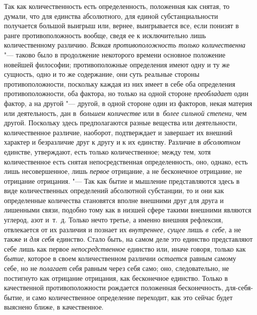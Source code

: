 \label{bkm:bm69a}Так как количественность есть определенность, положенная как
снятая, то думали, что для единства абсолютного, для единой субстанциальности
получается большой выигрыш или, вернее, выигрывается все, если понизят в ранге
противоположность вообще, сведя ее к исключительно лишь количественному
различию. {\em Всякая противоположность только количественна} "--- таково было
в продолжение некоторого времени основное положение новейшей
философии; противоположные определения
имеют одну и ту же сущность, одно и то же содержание, они суть реальные стороны
противоположности, поскольку каждая из них имеет в себе оба определения
противоположности, оба фактора, но только на одной стороне {\em преобладает}
один фактор, а на другой "--- другой, в одной стороне один из факторов, некая
материя или деятельность, дан в~{\em большем количестве} или
в~{\em более сильной степени}, чем другой. Поскольку здесь предполагаются
разные вещества или деятельности, количественное различие, наоборот,
подтверждает и завершает их внешний характер и безразличие друг к другу и к их
единству. Различие в {\em абсолютном} единстве, утверждают, есть только
количественное; между тем, хотя количественное есть снятая непосредственная
определенность, оно, однако, есть лишь несовершенное, лишь {\em первое}
отрицание, а не бесконечное отрицание, не отрицание отрицания. "--- Так как
бытие и мышление представляются здесь в виде количественных определений
абсолютной субстанции, то и они как определенные количества становятся вполне
внешними друг для друга и лишенными связи, подобно тому как в низшей сфере
такими внешними являются углерод, азот и~т.~д. Только нечто третье, а именно
внешняя рефлексия, отвлекается от их различия и познает их
{\em внутреннее, сущее} лишь {\em в~себе}, а не также и {\em для себя}
единство. Стало быть, на самом деле это единство представляют себе лишь как
первое {\em непосредственное} единство или, иначе говоря, только как
{\em бытие}, которое в своем количественном различии {\em остается} равным
самому себе, но не {\em полагает} себя равным через себя само; оно,
следовательно, не постигнуто как отрицание отрицания, как бесконечное единство.
Только в качественной противоположности рождается положенная бесконечность,
для-себя-бытие, и само количественное определение переходит, как это сейчас
будет выяснено ближе, в качественное.

\bigskip


